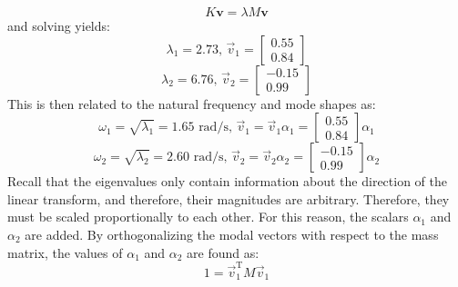 \documentclass[12pt,letter]{article}
\begin{document}
\begin{example}
	\begin{equation}
		K \textbf{v} = \lambda M \textbf{v}
	\end{equation}
	and solving yields:
	\begin{equation}
		\lambda_1 = 2.73 \text{, } \vec{v}_1 = \begin{bmatrix} 0.55 \\  0.84 \end{bmatrix} 
	\end{equation}
	\begin{equation}
		\lambda_2 = 6.76 \text{, } \vec{v}_2 = \begin{bmatrix} -0.15 \\  0.99 \end{bmatrix}  \nonumber
	\end{equation}
	This is then related to the natural frequency and mode shapes as:
	\begin{equation}
		\omega_1 = \sqrt{\lambda_1} = 1.65 \text{ rad/s, } \vec{v}_1 = \vec{v}_1 \alpha_1 = \begin{bmatrix} 0.55 \\  0.84 \end{bmatrix} \alpha_1
	\end{equation}
	\begin{equation}
		\omega_2 = \sqrt{\lambda_2} = 2.60 \text{ rad/s, } \vec{v}_2 = \vec{v}_2 \alpha_2 = \begin{bmatrix} -0.15 \\  0.99 \end{bmatrix} \alpha_2 
	\end{equation}
	Recall that the eigenvalues only contain information about the direction of the linear transform, and therefore, their magnitudes are arbitrary. Therefore, they must be scaled proportionally to each other. For this reason, the scalars $\alpha_1$ and $\alpha_2$ are added. By orthogonalizing the modal vectors with respect to the mass matrix, the values of $\alpha_1$ and $\alpha_2$ are found as:
	\begin{equation}
		1 = \vec{v}_1^\text{T} M \vec{v}_1 
	\end{equation}

\end{example}
\end{document}
